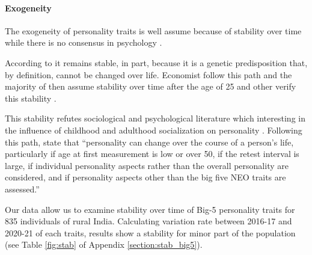 \documentclass[a4paper, 11pt, onecolumn]{article}
\begin{document}
\paragraph{Exogeneity}
The exogeneity of personality traits is well assume because of stability over time while there is no consensus in psychology \citep{Ardelt2000}.

According to \cite{Costa1997, McCrae2000} it remains stable, in part, because it is a genetic predisposition that, by definition, cannot be changed over life.
Economist follow this path and the majority of then assume stability over time after the age of 25 and other verify this stability \citep{CobbClark2011}. 

This stability refutes sociological and psychological literature which interesting in the influence of childhood and adulthood socialization on personality \citep{Mortimer1978, Moen1995}.
Following this path, \cite{Ardelt2000} state that ``personality can change over the course of a person's life, particularly if age at first measurement is low or over 50, if the retest interval is large, if individual personality aspects rather than the overall personality are considered, and if personality aspects other than the big five NEO traits are assessed.''


Our data allow us to examine stability over time of Big-5 personality traits for 835 individuals of rural India.
Calculating variation rate between 2016-17 and 2020-21 of each traits, results show a stability for minor part of the population (see Table \ref{fig:stab} of Appendix \ref{section:stab_big5}).
\end{document}
